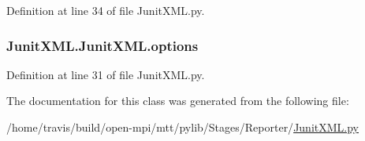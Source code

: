 Definition at line 34 of file Junit\-X\-M\-L.\-py.

\hypertarget{class_junit_x_m_l_1_1_junit_x_m_l_a7fad493a74a8051511f76e4edde36a76}{
\subsubsection[{options}]{\setlength{\rightskip}{0pt plus 5cm}Junit\-X\-M\-L.\-Junit\-X\-M\-L.\-options}}\label{class_junit_x_m_l_1_1_junit_x_m_l_a7fad493a74a8051511f76e4edde36a76}


Definition at line 31 of file Junit\-X\-M\-L.\-py.



The documentation for this class was generated from the following file\-:\begin{DoxyCompactItemize}
\item 
/home/travis/build/open-\/mpi/mtt/pylib/\-Stages/\-Reporter/\hyperlink{_junit_x_m_l_8py}{Junit\-X\-M\-L.\-py}\end{DoxyCompactItemize}
